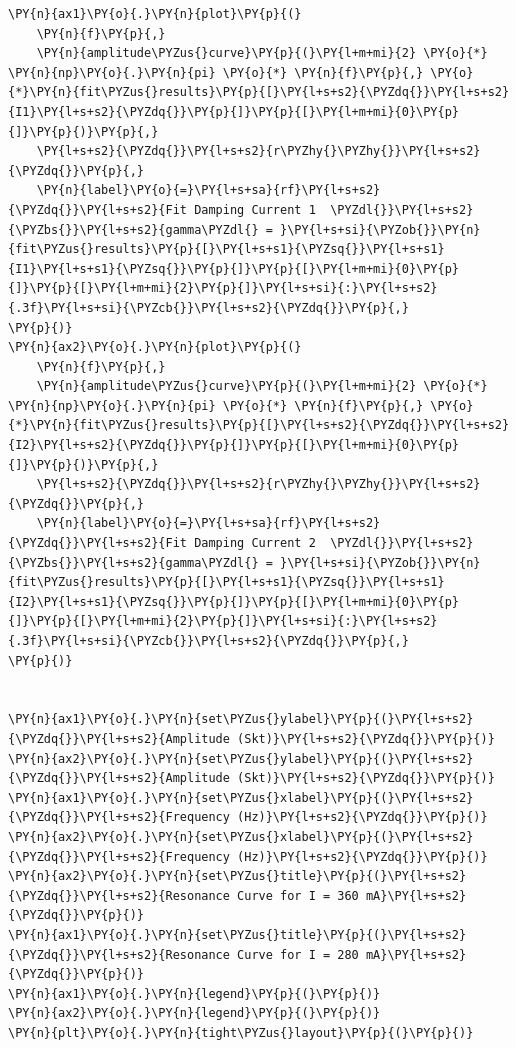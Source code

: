 \begin{tcolorbox}[breakable, size=fbox, boxrule=1pt, pad at break*=1mm,colback=cellbackground, colframe=cellborder]
\begin{Verbatim}[commandchars=\\\{\}]
\PY{n}{ax1}\PY{o}{.}\PY{n}{plot}\PY{p}{(}
    \PY{n}{f}\PY{p}{,}
    \PY{n}{amplitude\PYZus{}curve}\PY{p}{(}\PY{l+m+mi}{2} \PY{o}{*} \PY{n}{np}\PY{o}{.}\PY{n}{pi} \PY{o}{*} \PY{n}{f}\PY{p}{,} \PY{o}{*}\PY{n}{fit\PYZus{}results}\PY{p}{[}\PY{l+s+s2}{\PYZdq{}}\PY{l+s+s2}{I1}\PY{l+s+s2}{\PYZdq{}}\PY{p}{]}\PY{p}{[}\PY{l+m+mi}{0}\PY{p}{]}\PY{p}{)}\PY{p}{,}
    \PY{l+s+s2}{\PYZdq{}}\PY{l+s+s2}{r\PYZhy{}\PYZhy{}}\PY{l+s+s2}{\PYZdq{}}\PY{p}{,}
    \PY{n}{label}\PY{o}{=}\PY{l+s+sa}{rf}\PY{l+s+s2}{\PYZdq{}}\PY{l+s+s2}{Fit Damping Current 1  \PYZdl{}}\PY{l+s+s2}{\PYZbs{}}\PY{l+s+s2}{gamma\PYZdl{} = }\PY{l+s+si}{\PYZob{}}\PY{n}{fit\PYZus{}results}\PY{p}{[}\PY{l+s+s1}{\PYZsq{}}\PY{l+s+s1}{I1}\PY{l+s+s1}{\PYZsq{}}\PY{p}{]}\PY{p}{[}\PY{l+m+mi}{0}\PY{p}{]}\PY{p}{[}\PY{l+m+mi}{2}\PY{p}{]}\PY{l+s+si}{:}\PY{l+s+s2}{.3f}\PY{l+s+si}{\PYZcb{}}\PY{l+s+s2}{\PYZdq{}}\PY{p}{,}
\PY{p}{)}
\PY{n}{ax2}\PY{o}{.}\PY{n}{plot}\PY{p}{(}
    \PY{n}{f}\PY{p}{,}
    \PY{n}{amplitude\PYZus{}curve}\PY{p}{(}\PY{l+m+mi}{2} \PY{o}{*} \PY{n}{np}\PY{o}{.}\PY{n}{pi} \PY{o}{*} \PY{n}{f}\PY{p}{,} \PY{o}{*}\PY{n}{fit\PYZus{}results}\PY{p}{[}\PY{l+s+s2}{\PYZdq{}}\PY{l+s+s2}{I2}\PY{l+s+s2}{\PYZdq{}}\PY{p}{]}\PY{p}{[}\PY{l+m+mi}{0}\PY{p}{]}\PY{p}{)}\PY{p}{,}
    \PY{l+s+s2}{\PYZdq{}}\PY{l+s+s2}{r\PYZhy{}\PYZhy{}}\PY{l+s+s2}{\PYZdq{}}\PY{p}{,}
    \PY{n}{label}\PY{o}{=}\PY{l+s+sa}{rf}\PY{l+s+s2}{\PYZdq{}}\PY{l+s+s2}{Fit Damping Current 2  \PYZdl{}}\PY{l+s+s2}{\PYZbs{}}\PY{l+s+s2}{gamma\PYZdl{} = }\PY{l+s+si}{\PYZob{}}\PY{n}{fit\PYZus{}results}\PY{p}{[}\PY{l+s+s1}{\PYZsq{}}\PY{l+s+s1}{I2}\PY{l+s+s1}{\PYZsq{}}\PY{p}{]}\PY{p}{[}\PY{l+m+mi}{0}\PY{p}{]}\PY{p}{[}\PY{l+m+mi}{2}\PY{p}{]}\PY{l+s+si}{:}\PY{l+s+s2}{.3f}\PY{l+s+si}{\PYZcb{}}\PY{l+s+s2}{\PYZdq{}}\PY{p}{,}
\PY{p}{)}


\PY{n}{ax1}\PY{o}{.}\PY{n}{set\PYZus{}ylabel}\PY{p}{(}\PY{l+s+s2}{\PYZdq{}}\PY{l+s+s2}{Amplitude (Skt)}\PY{l+s+s2}{\PYZdq{}}\PY{p}{)}
\PY{n}{ax2}\PY{o}{.}\PY{n}{set\PYZus{}ylabel}\PY{p}{(}\PY{l+s+s2}{\PYZdq{}}\PY{l+s+s2}{Amplitude (Skt)}\PY{l+s+s2}{\PYZdq{}}\PY{p}{)}
\PY{n}{ax1}\PY{o}{.}\PY{n}{set\PYZus{}xlabel}\PY{p}{(}\PY{l+s+s2}{\PYZdq{}}\PY{l+s+s2}{Frequency (Hz)}\PY{l+s+s2}{\PYZdq{}}\PY{p}{)}
\PY{n}{ax2}\PY{o}{.}\PY{n}{set\PYZus{}xlabel}\PY{p}{(}\PY{l+s+s2}{\PYZdq{}}\PY{l+s+s2}{Frequency (Hz)}\PY{l+s+s2}{\PYZdq{}}\PY{p}{)}
\PY{n}{ax2}\PY{o}{.}\PY{n}{set\PYZus{}title}\PY{p}{(}\PY{l+s+s2}{\PYZdq{}}\PY{l+s+s2}{Resonance Curve for I = 360 mA}\PY{l+s+s2}{\PYZdq{}}\PY{p}{)}
\PY{n}{ax1}\PY{o}{.}\PY{n}{set\PYZus{}title}\PY{p}{(}\PY{l+s+s2}{\PYZdq{}}\PY{l+s+s2}{Resonance Curve for I = 280 mA}\PY{l+s+s2}{\PYZdq{}}\PY{p}{)}
\PY{n}{ax1}\PY{o}{.}\PY{n}{legend}\PY{p}{(}\PY{p}{)}
\PY{n}{ax2}\PY{o}{.}\PY{n}{legend}\PY{p}{(}\PY{p}{)}
\PY{n}{plt}\PY{o}{.}\PY{n}{tight\PYZus{}layout}\PY{p}{(}\PY{p}{)}
\end{Verbatim}
\end{tcolorbox}


